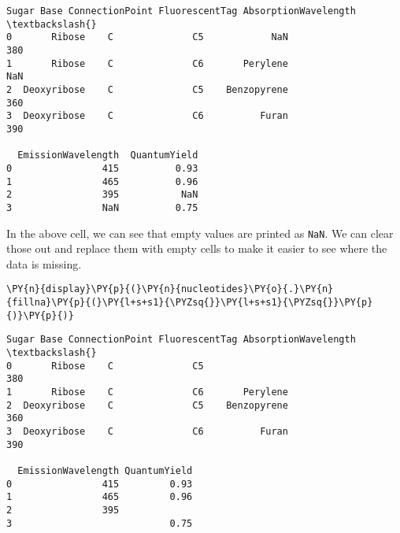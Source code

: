     
    \begin{Verbatim}[commandchars=\\\{\}]
         Sugar Base ConnectionPoint FluorescentTag AbsorptionWavelength  \textbackslash{}
0       Ribose    C              C5            NaN                  380   
1       Ribose    C              C6       Perylene                  NaN   
2  Deoxyribose    C              C5    Benzopyrene                  360   
3  Deoxyribose    C              C6          Furan                  390   

  EmissionWavelength  QuantumYield  
0                415          0.93  
1                465          0.96  
2                395           NaN  
3                NaN          0.75  
    \end{Verbatim}

    
    In the above cell, we can see that empty values are printed as
\texttt{NaN}. We can clear those out and replace them with empty cells
to make it easier to see where the data is missing.

    \begin{tcolorbox}[breakable, size=fbox, boxrule=1pt, pad at break*=1mm,colback=cellbackground, colframe=cellborder]
\begin{Verbatim}[commandchars=\\\{\}]
\PY{n}{display}\PY{p}{(}\PY{n}{nucleotides}\PY{o}{.}\PY{n}{fillna}\PY{p}{(}\PY{l+s+s1}{\PYZsq{}}\PY{l+s+s1}{\PYZsq{}}\PY{p}{)}\PY{p}{)}
\end{Verbatim}
\end{tcolorbox}

    
    \begin{Verbatim}[commandchars=\\\{\}]
         Sugar Base ConnectionPoint FluorescentTag AbsorptionWavelength  \textbackslash{}
0       Ribose    C              C5                                 380   
1       Ribose    C              C6       Perylene                        
2  Deoxyribose    C              C5    Benzopyrene                  360   
3  Deoxyribose    C              C6          Furan                  390   

  EmissionWavelength QuantumYield  
0                415         0.93  
1                465         0.96  
2                395               
3                            0.75  
    \end{Verbatim}

